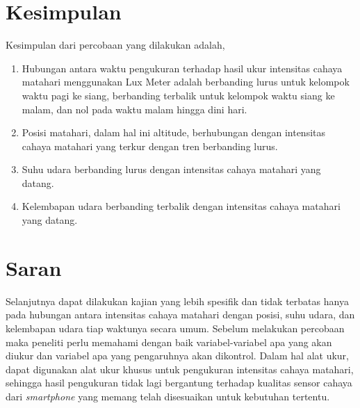 \section{Kesimpulan}
Kesimpulan dari percobaan yang dilakukan adalah,
\begin{enumerate}[leftmargin=*]
    \item Hubungan antara waktu pengukuran terhadap hasil ukur intensitas cahaya matahari menggunakan Lux Meter adalah berbanding lurus untuk kelompok waktu pagi ke siang, berbanding terbalik untuk kelompok waktu siang ke malam, dan nol pada waktu malam hingga dini hari.
    \item Posisi matahari, dalam hal ini altitude, berhubungan dengan intensitas cahaya matahari yang terkur dengan tren berbanding lurus.
    \item Suhu udara berbanding lurus dengan intensitas cahaya matahari yang datang.
    \item Kelembapan udara berbanding terbalik dengan intensitas cahaya matahari yang datang.
\end{enumerate}

\section{Saran}
Selanjutnya dapat dilakukan kajian yang lebih spesifik dan tidak terbatas hanya pada hubungan antara intensitas cahaya matahari dengan posisi, suhu udara, dan kelembapan udara tiap waktunya secara umum. Sebelum melakukan percobaan maka peneliti perlu memahami dengan baik variabel-variabel apa yang akan diukur dan variabel apa yang pengaruhnya akan dikontrol. Dalam hal alat ukur, dapat digunakan alat ukur khusus untuk pengukuran intensitas cahaya matahari, sehingga hasil pengukuran tidak lagi bergantung terhadap kualitas sensor cahaya dari \textit{smartphone} yang memang telah disesuaikan untuk kebutuhan tertentu.
